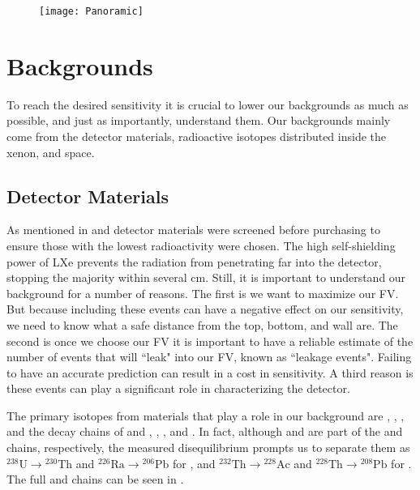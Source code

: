 \begin{figure}
\centering
\texttt{[image: Panoramic]}
\label{fig:xenon1t_panoramic}
\end{figure}



\section{Backgrounds}
\label{sec:backgrounds}
To reach the desired sensitivity it is crucial to lower our backgrounds as much as possible, and just as importantly, understand
them.  Our backgrounds mainly come from the detector materials, radioactive isotopes distributed inside the xenon, and space.

\subsection{Detector Materials}
\label{subsec:backgrounds_detector_materials}
As mentioned in  and  detector materials were screened before purchasing to ensure
those with the lowest radioactivity were chosen.  The high self-shielding power of LXe prevents the radiation from penetrating far into
the detector, stopping the majority within several cm.  Still, it is important to understand our background for a number of reasons.  The
first is we want to maximize our FV.  But because including these events can have a negative effect on our sensitivity, we need to know
what a safe distance from the top, bottom, and wall are.  The second is once we choose our FV it is important to have a reliable estimate
of the number of events that will ``leak" into our FV, known as ``leakage events".  Failing to have an accurate prediction can result in
a cost in sensitivity.  A third reason is these events can play a significant role in characterizing the detector.

The primary isotopes from materials that play a role in our background are , , , and the decay chains
of and , , , and .  In fact, although  and  are part of the
 and  chains, respectively, the measured disequilibrium prompts us to separate them as
$\mathrm{^{238}U} \rightarrow \mathrm{^{230}Th}$ and $\mathrm{^{226}Ra} \rightarrow \mathrm{^{206}Pb}$ for , and
$\mathrm{^{232}Th} \rightarrow \mathrm{^{228}Ac}$ and $\mathrm{^{228}Th} \rightarrow \mathrm{^{208}Pb}$ for .  The full
 and  chains can be seen in .

